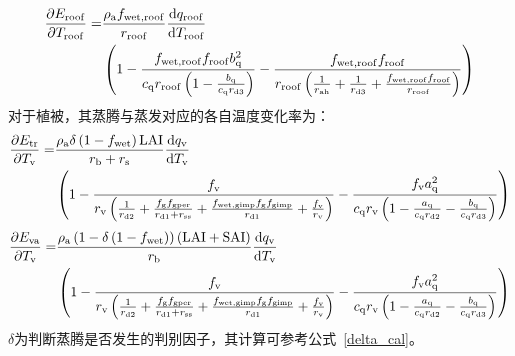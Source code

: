 %
%
\begin{equation}
  \begin{split}
    \frac{\partial  E_{\mathrm{roof}}}{\partial T_{\mathrm{roof}}} = &\frac{\rho _{\rm a} f_{\mathrm{wet,roof}}}{r_{\mathrm{roof}}} \frac{{\mathrm {d}} q_{\mathrm{roof}}}{{\mathrm {d}} T_{\mathrm{roof}}} \\
    & \left(1-\frac{f_{\mathrm{wet,roof}}f_{\mathrm{roof}} b_{\mathrm{q}}^2}{c_{\mathrm{q}} r_{\mathrm{roof}} \left(1-\frac{b_{\mathrm{q}}}{c_{\mathrm{q}} r_{\mathrm{d3}}}\right)}-\frac{f_{\mathrm{wet,roof}}f_{\mathrm{roof}}}{r_{\mathrm{roof}}\left(\frac{1}{r_{\mathrm{ah}}}+\frac{1}{r_{\mathrm{d3}}}+\frac{f_{\mathrm{wet,roof}} f_{\mathrm{roof}}}{r_{\mathrm{roof}}}\right)}\right)
  \end{split}
\end{equation}
对于植被，其蒸腾与蒸发对应的各自温度变化率为：
%
\begin{equation}
  \begin{split}
    \frac{\partial  E_{\mathrm{tr}}}{\partial T_{\mathrm{v}}} = &\frac{\rho _{\rm a} \delta \left(1-f_{\mathrm{wet}}\right) {\rm LAI}} {r_{\mathrm{b}}+r_{\mathrm{s}}} \frac{{\mathrm {d}} q_{\mathrm{v}}}{{\mathrm {d}} T_{\mathrm{v}}} \\
    &\left(1-\frac{f_{\mathrm{v}}}{r_{\mathrm{v}}\left(\frac{1}{r_{\mathrm{d2}}} + \frac{f_{\mathrm{g}} f_{\mathrm{gper}}}{r_{\mathrm{d1}} + r_{\mathrm{ss}}} + \frac{f_{\mathrm{wet,gimp}} f_{\mathrm{g}} f_{\mathrm{gimp}}}{r_{\mathrm{d1}}}+\frac{f_{\rm v}}{r_{\mathrm{v}}}\right)} - \frac{f_{\mathrm{v}} a_{\mathrm{q}}^2}{c_{\mathrm{q}} r_{\mathrm{v}} \left( 1 - \frac{a_{\mathrm{q}}}{c_{\mathrm{q}} r_{\mathrm{d2}}} - \frac{b_{\mathrm{q}}}{c_{\mathrm{q}} r_{\mathrm{d3}}} \right)}\right)
  \end{split}
\end{equation}
%
\begin{equation}
  \begin{split}
    \frac{\partial  E_{\mathrm{va}}}{\partial T_{\mathrm{v}}} = &\frac{\rho _{\rm a} \left(1-\delta\left(1-f_{\mathrm{wet}}\right)\right)\left({\rm LAI}+{\rm SAI}\right)}{r_{\mathrm{b}}} \frac{{\mathrm {d}} q_{\mathrm{v}}}{{\mathrm {d}} T_{\mathrm{v}}} \\
    &\left(1-\frac{f_{\mathrm{v}}}{r_{\mathrm{v}}\left(\frac{1}{r_{\mathrm{d2}}} + \frac{f_{\mathrm{g}} f_{\mathrm{gper}}}{r_{\mathrm{d1}} + r_{\mathrm{ss}}} + \frac{f_{\mathrm{wet,gimp}} f_{\mathrm{g}} f_{\mathrm{gimp}}}{r_{\mathrm{d1}}}+\frac{f_{\rm v}}{r_{\mathrm{v}}}\right)} - \frac{f_{\mathrm{v}} a_{\mathrm{q}}^2}{c_{\mathrm{q}} r_{\mathrm{v}} \left( 1 - \frac{a_{\mathrm{q}}}{c_{\mathrm{q}} r_{\mathrm{d2}}} - \frac{b_{\mathrm{q}}}{c_{\mathrm{q}} r_{\mathrm{d3}}} \right)}\right)
  \end{split}
\end{equation}
$\delta$为判断蒸腾是否发生的判别因子，其计算可参考公式~\eqref{delta_cal}。
